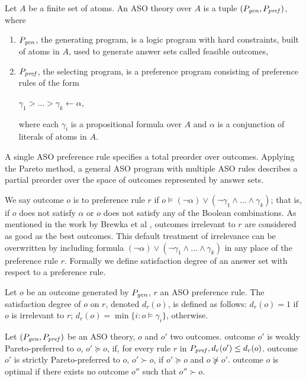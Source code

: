\begin{definition}
	Let $A$ be a finite set of atoms.
	An ASO theory over $A$ is a tuple $(P_{\mathit{gen}},P_{\mathit{pref}})$, where
	\begin{enumerate} \itemsep -4pt
		\item $P_{\mathit{gen}}$, the generating program, is a logic program
					with hard constraints, built of atoms in $A$,
					used to generate answer sets called feasible outcomes,
		\item $P_{\mathit{pref}}$, the selecting program, is a preference
					program consisting of preference rules of the form
			\begin{center}
				$\gamma_1 > \ldots > \gamma_k \leftarrow \alpha$,
			\end{center}
					where each $\gamma_i$ is a propositional formula
					over $A$ and $\alpha$ is a conjunction of
					literals of atoms in $A$.
	\end{enumerate}
\end{definition}


A single ASO preference rule specifies a total preorder over outcomes.
Applying the Pareto method, a general ASO program with multiple ASO rules
describes a partial preorder over the space of outcomes represented by answer sets.

We say outcome $o$ is  to preference rule $r$ if
$o \models (\neg \alpha) \vee (\neg \gamma_1 \wedge \ldots \wedge \gamma_k)$;
that is, if $o$ does not satisfy $\alpha$ or $o$ does not satisfy any of
the Boolean combinations. As mentioned in the work by Brewka et al \cite{Brewka03answerset},
outcomes irrelevant to $r$ are considered as good as the
best outcomes.
This default treatment of irrelevance can be overwritten by
including formula $(\neg \alpha) \vee (\neg \gamma_1 \wedge \ldots \wedge \gamma_k)$
in any place of the preference rule $r$.
Formally we define satisfaction degree of an answer set with respect to a
preference rule.
\begin{definition}
	Let $o$ be an outcome generated by $P_{\mathit{gen}}$,
	$r$ an ASO preference rule.
	The satisfaction degree of $o$ on $r$, denoted $d_r(o)$,
	is defined as follows: $d_r(o)=1$ if $o$ is irrelevant to $r$;
	$d_r(o)=\min\{i:o \models \gamma_i\}$, otherwise.
\end{definition}

\begin{definition}
	Let $(P_{\mathit{gen}}, P_{\mathit{pref}})$ be an ASO theory,
	$o$ and $o'$ two outcomes.
	outcome $o'$ is weakly Pareto-preferred to $o$, $o' \succeq o$,
	if, for every rule $r$ in $P_{\mathit{pref}}, d_r(o') \leq d_r(o)$.
	outcome $o'$ is strictly Pareto-preferred to $o$, $o' \succ o$,
	if $o' \succeq o$ and $o \not \succeq o'$.
	outcome $o$ is optimal if there exists no outcome $o''$ such that
	$o'' \succ o$.
\end{definition}

